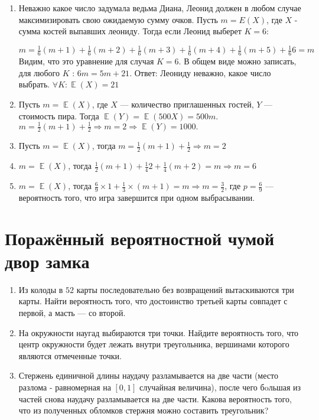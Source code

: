 \documentclass[a4paper,12pt]{article}
\DeclareMathOperator{\E}{\mathbb{E}}
\begin{document}
\begin{enumerate}
\item Неважно какое число задумала ведьма Диана, Леонид должен в любом случае максимизировать свою ожидаемую сумму очков. Пусть $m = E(X)$, где $X$ - сумма костей выпавших леониду. Тогда если Леонид выберет $K = 6$:

$m =\frac{1}{6}(m+1) + \frac{1}{6}(m+2) + \frac{1}{6}(m+3) + \frac{1}{6}(m+4) + \frac{1}{6}(m+5) + \frac{1}{6} 6 = m$ Видим, что это уравнение для случая $K = 6$. В общем виде можно записать, для любого $K$ : $6m = 5m + 21$. Ответ: Леониду неважно, какое число выбрать. $\forall K:  \E(X) = 21$
\item Пусть $m = \E(X)$, где $X$ — количество приглашенных гостей, $Y$ — стоимость пира. Тогда $\E(Y) = \E(500  X) = 500 m$. $m = \frac{1}{2}(m+1) + \frac{1}{2} \Rightarrow m = 2 \Rightarrow \E(Y) = 1000.$
\item Пусть $m = \E(X)$, тогда $m = \frac{1}{2}(m+1) + \frac{1}{2} \Rightarrow m = 2$
\item $m = \E(X)$, тогда $\frac{1}{2}(m+1) + \frac{1}{4} 2 + \frac{1}{4}(m+2)=m \Rightarrow m = 6$
\item $m = \E(X)$, тогда $\frac{6}{9} \times 1 + \frac{1}{3} \times (m+1) = m \Rightarrow m = \frac{3}{2}$, где $p = \frac{6}{9}$  — вероятность того, что игра завершится при одном выбрасывании.
\end{enumerate}




\newpage
\section{Поражённый вероятностной чумой двор замка}

\begin{enumerate}
\item %

Из колоды в $52$ карты последовательно без возвращений вытаскиваются три карты. Найти вероятность того, что достоинство третьей карты совпадет с первой, а масть — со второй.

\item %

На окружности наугад выбираются три точки. Найдите вероятность того, что центр окружности будет лежать внутри треугольника, вершинами которого являются отмеченные точки.

\item

Стержень единичной длины наудачу разламывается на две части (место разлома - равномерная на $[0,1]$ случайная величина), после чего бoльшая из частей снова наудачу разламывается на две части. Какова вероятность того, что из полученных обломков стержня можно составить треугольник?
\end{enumerate}
\end{document}
